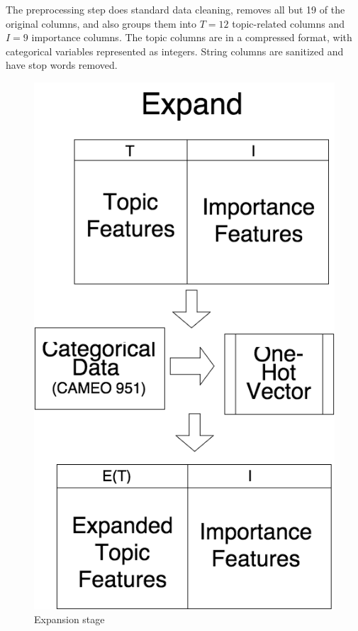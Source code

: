 The preprocessing step does standard data cleaning, removes all but 19 of the original columns, and also groups them into $T=12$ topic-related columns and $I=9$ importance columns. The topic columns are in a compressed format, with categorical variables represented as integers. String columns are sanitized and have stop words removed.

\begin{figure}[ht]
\vskip 0.2in
\begin{center}
\centerline{\includegraphics[scale=0.15]{images/expand_vertical.png}}
\caption{Expansion stage}
\end{center}
\vskip -0.2in
\label{fig:exapand}
\end{figure}

